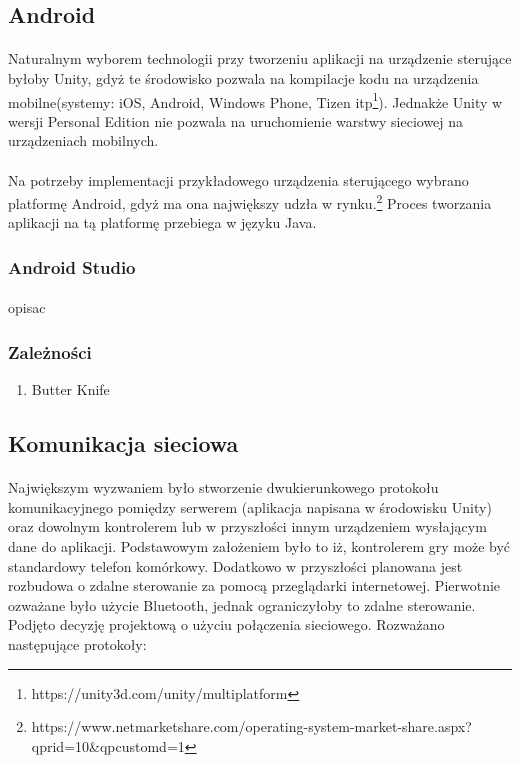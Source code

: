 \documentclass[12pt]{article}
\begin{document}
{{\subsection{Android}
\paragraph{}
Naturalnym wyborem technologii przy tworzeniu aplikacji na urządzenie sterujące byłoby Unity, gdyż te środowisko pozwala na kompilacje kodu na urządzenia mobilne(systemy: iOS, Android, Windows Phone, Tizen itp\footnote{https://unity3d.com/unity/multiplatform}). Jednakże Unity w wersji Personal Edition nie pozwala na uruchomienie warstwy sieciowej na urządzeniach mobilnych.

\paragraph{}
Na potrzeby implementacji przykładowego urządzenia sterującego wybrano platformę Android, gdyż ma ona największy udzła w rynku.\footnote{https://www.netmarketshare.com/operating-system-market-share.aspx?qprid=10\&qpcustomd=1} Proces tworzania aplikacji na tą platformę przebiega w języku Java.

\subsubsection{Android Studio}
\paragraph{}
opisac

\subsubsection{Zależności}
\begin{enumerate}
	\item Butter Knife
\end{enumerate}

\subsection{Komunikacja sieciowa}
\paragraph{}
Największym wyzwaniem było stworzenie dwukierunkowego protokołu komunikacyjnego pomiędzy serwerem (aplikacja napisana w środowisku Unity) oraz dowolnym kontrolerem lub w przyszłości innym urządzeniem wysłającym dane do aplikacji. Podstawowym założeniem było to iż, kontrolerem gry może być standardowy telefon komórkowy. Dodatkowo w przyszłości planowana jest rozbudowa o zdalne sterowanie za pomocą przeglądarki internetowej. Pierwotnie ozważane było użycie Bluetooth, jednak ograniczyłoby to zdalne sterowanie. Podjęto decyzję projektową o użyciu połączenia sieciowego. Rozważano następujące protokoły:

}}
\end{document}
